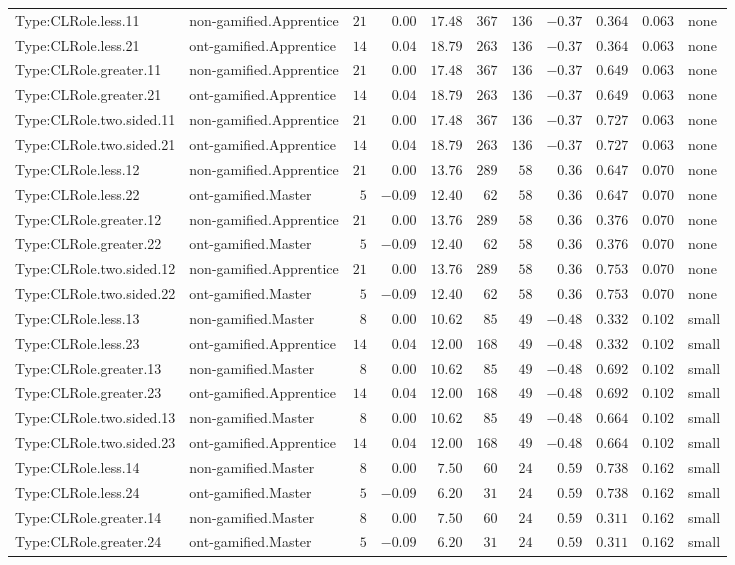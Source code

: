 \documentclass[6pt,a4paper]{article}
\begin{document}
{\begin{longtable}{llrrrrrrrrl}
Type:CLRole.less.11&non-gamified.Apprentice&$21$&$ 0.00$&$17.48$&$367$&$136$&$-0.37$&$0.364$&$0.063$&none\tabularnewline
Type:CLRole.less.21&ont-gamified.Apprentice&$14$&$ 0.04$&$18.79$&$263$&$136$&$-0.37$&$0.364$&$0.063$&none\tabularnewline
Type:CLRole.greater.11&non-gamified.Apprentice&$21$&$ 0.00$&$17.48$&$367$&$136$&$-0.37$&$0.649$&$0.063$&none\tabularnewline
Type:CLRole.greater.21&ont-gamified.Apprentice&$14$&$ 0.04$&$18.79$&$263$&$136$&$-0.37$&$0.649$&$0.063$&none\tabularnewline
Type:CLRole.two.sided.11&non-gamified.Apprentice&$21$&$ 0.00$&$17.48$&$367$&$136$&$-0.37$&$0.727$&$0.063$&none\tabularnewline
Type:CLRole.two.sided.21&ont-gamified.Apprentice&$14$&$ 0.04$&$18.79$&$263$&$136$&$-0.37$&$0.727$&$0.063$&none\tabularnewline
Type:CLRole.less.12&non-gamified.Apprentice&$21$&$ 0.00$&$13.76$&$289$&$ 58$&$ 0.36$&$0.647$&$0.070$&none\tabularnewline
Type:CLRole.less.22&ont-gamified.Master&$ 5$&$-0.09$&$12.40$&$ 62$&$ 58$&$ 0.36$&$0.647$&$0.070$&none\tabularnewline
Type:CLRole.greater.12&non-gamified.Apprentice&$21$&$ 0.00$&$13.76$&$289$&$ 58$&$ 0.36$&$0.376$&$0.070$&none\tabularnewline
Type:CLRole.greater.22&ont-gamified.Master&$ 5$&$-0.09$&$12.40$&$ 62$&$ 58$&$ 0.36$&$0.376$&$0.070$&none\tabularnewline
Type:CLRole.two.sided.12&non-gamified.Apprentice&$21$&$ 0.00$&$13.76$&$289$&$ 58$&$ 0.36$&$0.753$&$0.070$&none\tabularnewline
Type:CLRole.two.sided.22&ont-gamified.Master&$ 5$&$-0.09$&$12.40$&$ 62$&$ 58$&$ 0.36$&$0.753$&$0.070$&none\tabularnewline
Type:CLRole.less.13&non-gamified.Master&$ 8$&$ 0.00$&$10.62$&$ 85$&$ 49$&$-0.48$&$0.332$&$0.102$&small\tabularnewline
Type:CLRole.less.23&ont-gamified.Apprentice&$14$&$ 0.04$&$12.00$&$168$&$ 49$&$-0.48$&$0.332$&$0.102$&small\tabularnewline
Type:CLRole.greater.13&non-gamified.Master&$ 8$&$ 0.00$&$10.62$&$ 85$&$ 49$&$-0.48$&$0.692$&$0.102$&small\tabularnewline
Type:CLRole.greater.23&ont-gamified.Apprentice&$14$&$ 0.04$&$12.00$&$168$&$ 49$&$-0.48$&$0.692$&$0.102$&small\tabularnewline
Type:CLRole.two.sided.13&non-gamified.Master&$ 8$&$ 0.00$&$10.62$&$ 85$&$ 49$&$-0.48$&$0.664$&$0.102$&small\tabularnewline
Type:CLRole.two.sided.23&ont-gamified.Apprentice&$14$&$ 0.04$&$12.00$&$168$&$ 49$&$-0.48$&$0.664$&$0.102$&small\tabularnewline
Type:CLRole.less.14&non-gamified.Master&$ 8$&$ 0.00$&$ 7.50$&$ 60$&$ 24$&$ 0.59$&$0.738$&$0.162$&small\tabularnewline
Type:CLRole.less.24&ont-gamified.Master&$ 5$&$-0.09$&$ 6.20$&$ 31$&$ 24$&$ 0.59$&$0.738$&$0.162$&small\tabularnewline
Type:CLRole.greater.14&non-gamified.Master&$ 8$&$ 0.00$&$ 7.50$&$ 60$&$ 24$&$ 0.59$&$0.311$&$0.162$&small\tabularnewline
Type:CLRole.greater.24&ont-gamified.Master&$ 5$&$-0.09$&$ 6.20$&$ 31$&$ 24$&$ 0.59$&$0.311$&$0.162$&small\tabularnewline

\end{longtable}}
\end{document}
